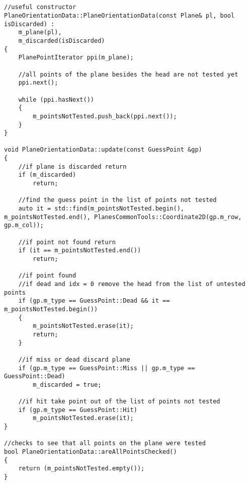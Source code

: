 \begin{lstlisting}


//useful constructor
PlaneOrientationData::PlaneOrientationData(const Plane& pl, bool isDiscarded) :
	m_plane(pl),
	m_discarded(isDiscarded)
{
	PlanePointIterator ppi(m_plane);
	
	//all points of the plane besides the head are not tested yet
	ppi.next();

	while (ppi.hasNext())
	{
		m_pointsNotTested.push_back(ppi.next());
	}
}

void PlaneOrientationData::update(const GuessPoint &gp)
{
	//if plane is discarded return
	if (m_discarded)
		return;
	
	//find the guess point in the list of points not tested
	auto it = std::find(m_pointsNotTested.begin(), m_pointsNotTested.end(), PlanesCommonTools::Coordinate2D(gp.m_row, gp.m_col));
	
	//if point not found return
	if (it == m_pointsNotTested.end())
		return;
	
	//if point found
	//if dead and idx = 0 remove the head from the list of untested points
	if (gp.m_type == GuessPoint::Dead && it == m_pointsNotTested.begin())
	{
		m_pointsNotTested.erase(it);
		return;
	}
	
	//if miss or dead discard plane
	if (gp.m_type == GuessPoint::Miss || gp.m_type == GuessPoint::Dead)
		m_discarded = true;
	
	//if hit take point out of the list of points not tested
	if (gp.m_type == GuessPoint::Hit)
		m_pointsNotTested.erase(it);
}

//checks to see that all points on the plane were tested
bool PlaneOrientationData::areAllPointsChecked()
{
	return (m_pointsNotTested.empty());
}

\end{lstlisting}